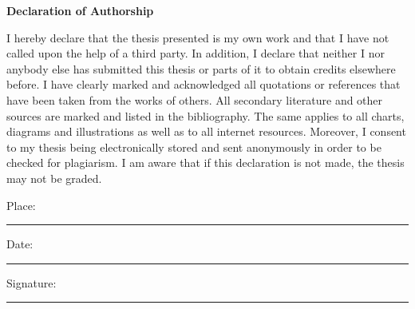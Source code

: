 \documentclass{DESSThesis}
\begin{document}
\def \TypeofThesis{Master's Thesis}
\def \TitleofThesis{Proof of Concept of a Trust-Minimized Cross-Chain Bridge from Bitcoin Layer 1 to Ethereum Layer 2}
\def \AuthorofThesis{Kai-Yan Pan}
\def \Supervisor{Prof. Dr. Markus Strohmaier} %
\def \Advisor{Stefano Balietti, Ph.D.}




\cleardoublepage %
\thispagestyle{empty} %
\begin{center}
    \vspace*{5cm}
    {\Large\bfseries Declaration of Authorship}
\end{center}

\vspace{1.5cm}

\begin{spacing}{1.5}
\noindent I hereby declare that the thesis presented is my own work and that I have not called upon the help of a third party. In addition, I declare that neither I nor anybody else has submitted this thesis or parts of it to obtain credits elsewhere before. I have clearly marked and acknowledged all quotations or references that have been taken from the works of others. All secondary literature and other sources are marked and listed in the bibliography. The same applies to all charts, diagrams and illustrations as well as to all internet resources. Moreover, I consent to my thesis being electronically stored and sent anonymously in order to be checked for plagiarism. I am aware that if this declaration is not made, the thesis may not be graded.
\end{spacing}

\vspace{2cm}

\noindent Place: \rule{6cm}{0.4pt} \hfill Date: \rule{4cm}{0.4pt}

\vspace{2cm}

\noindent Signature: \rule{10cm}{0.4pt}
\end{document}
